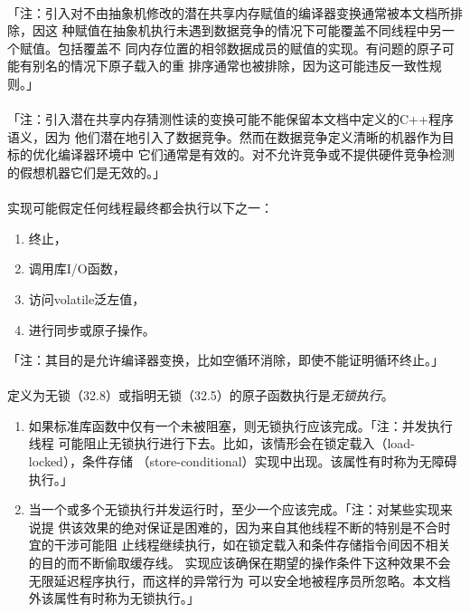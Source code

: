 \paragraph{}
「注：引入对不由抽象机修改的潜在共享内存赋值的编译器变换通常被本文档所排除，因这
种赋值在抽象机执行未遇到数据竞争的情况下可能覆盖不同线程中另一个赋值。包括覆盖不
同内存位置的相邻数据成员的赋值的实现。有问题的原子可能有别名的情况下原子载入的重
排序通常也被排除，因为这可能违反一致性规则。」

\paragraph{}
「注：引入潜在共享内存猜测性读的变换可能不能保留本文档中定义的C++程序语义，因为
他们潜在地引入了数据竞争。然而在数据竞争定义清晰的机器作为目标的优化编译器环境中
它们通常是有效的。对不允许竞争或不提供硬件竞争检测的假想机器它们是无效的。」

\paragraph{}
实现可能假定任何线程最终都会执行以下之一：
\begin{enumerate}
  \item{终止，}
  \item{调用库I/O函数，}
  \item{访问volatile泛左值，}
  \item{进行同步或原子操作。}
\end{enumerate}
「注：其目的是允许编译器变换，比如空循环消除，即使不能证明循环终止。」

\paragraph{}
定义为无锁（32.8）或指明无锁（32.5）的原子函数执行是\textit{无锁执行}。
\begin{enumerate}
  \item{如果标准库函数中仅有一个未被阻塞，则无锁执行应该完成。「注：并发执行线程
    可能阻止无锁执行进行下去。比如，该情形会在锁定载入（load-locked），条件存储
    （store-conditional）实现中出现。该属性有时称为无障碍执行。」}
  \item{当一个或多个无锁执行并发运行时，至少一个应该完成。「注：对某些实现来说提
    供该效果的绝对保证是困难的，因为来自其他线程不断的特别是不合时宜的干涉可能阻
    止线程继续执行，如在锁定载入和条件存储指令间因不相关的目的而不断偷取缓存线。
    实现应该确保在期望的操作条件下这种效果不会无限延迟程序执行，而这样的异常行为
    可以安全地被程序员所忽略。本文档外该属性有时称为无锁执行。」}
\end{enumerate}

